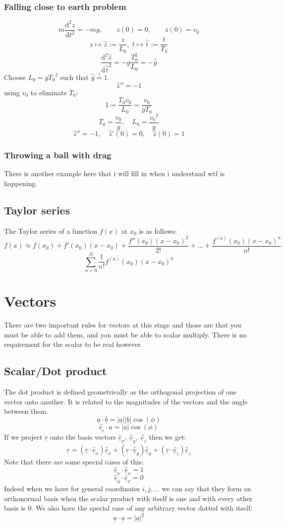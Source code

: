 \documentclass[12pt]{article}
\newcommand{\uvec}[1]{\underline{\hat{#1}}}
\newcommand{\bvec}[1]{\uvec{e}_#1}
\newcommand{\df}[2]{\frac{\text{d}#1}{\text{d}#2}}
\begin{document}
\subsubsection*{Falling close to earth problem}
\[m\df{^2z}{t^2}=-mg,\qquad z(0)=0,\qquad\overset{.}{z}(0)=v_0\]
\[z\mapsto\overset{\sim}{z}:=\frac{z}{L_0},\;t\mapsto\overset{\sim}{t}:=\frac{t}{T_0}\]
\[\df{^2\overset{\sim}{z}}{\overset{\sim}{t}^2}=-g\frac{T_0^2}{L_0}=-\overset{\sim}{g}\]
Choose \(L_0=g{T_0}^2\) such that \(\overset{\sim}{g}\overset{!}{=}1\).
\[\overset{\sim}{z}''=-1\]
using \(v_0\) to eliminate \(T_0\):
\[1=\frac{T_0v_0}{L_0}=\frac{v_0}{gT_0}\]
\[T_0=\frac{v_0}{g},\quad L_0=\frac{{v_0}^2}{g}\]
\[\overset{\sim}{z}''=-1,\quad\overset{\sim}{z}'(0)=0,\quad\overset{\sim}{z}(0)=1\]
\subsubsection*{Throwing a ball with drag}
There is another example here that i will fill in when i understand wtf is happening.
\subsection*{Taylor series}
The Taylor series of a function \(f(x)\) at \(x_0\) is as follows:
\[f(x)\approx f(x_0)+f'(x_0)(x-x_0)+\frac{f''(x_0)(x-x_0)^2}{2!}+...+\frac{f^{(n)}(x_0)(x-x_0)^n}{n!}\]
\[\sum_{n=0}^N\frac{1}{n!}f^{(n)}(x_0)(x-x_0)^n\]
\section{Vectors}
There are two important rules for vectors at this stage and those are that you must be able to add them, and you must be able to scalar multiply. There is no requirement for the scalar to be real however.
\subsection*{Scalar/Dot product}
The dot product is defined geometrically as the orthogonal projection of one vector onto another. It is related to the magnitudes of the vectors and the angle between them.
\[\underline{a}\cdot\underline{b}=|\underline{a}||\underline{b}|\cos{(\phi)}\]
\[\bvec{i}\cdot\underline{a}=|\underline{a}|\cos{(\phi)}\]
If we project \(\underline{r}\) onto the basis vectors \(\bvec{x},\;\bvec{y},\;\bvec{z}\) then we get:
\[\underline{r}=(\underline{r}\cdot\bvec{x})\bvec{x}+(\underline{r}\cdot\bvec{y})\bvec{y}+(\underline{r}\cdot\bvec{z})\bvec{z}\]
Note that there are some special cases of this:
\[\bvec{x}\cdot\bvec{x}=1\]
\[\bvec{y}\cdot\bvec{x}=0\]
Indeed when we have for general coordinates \(i,j,...\) we can say that they form an orthonormal basis when the scalar product with itself is one and with every other basis is 0. We also have the special case of any arbitrary vector dotted with itself:
\[\underline{a}\cdot\underline{a}=|\underline{a}|^2\]
\end{document}
